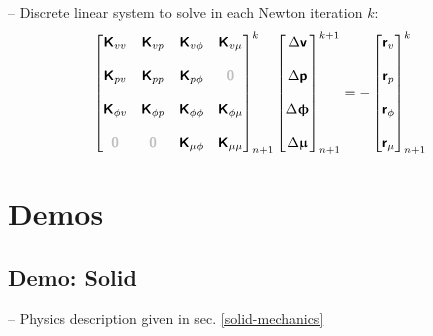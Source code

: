 \documentclass[a4paper,12pt]{report}
\newcommand{\bs}[1]{\boldsymbol{#1}}
\newcommand{\zerom}{\textcolor{lightgray}{\bs{\mathsf{0}}}}
\newcommand{\ROP}{\bs{\mathsf{r}}}
\begin{document}
-- Discrete linear system to solve in each Newton iteration $k$:
\begin{equation}
\label{equation-lin-sys-multiphase}
\begin{aligned}
\begin{bmatrix} \boldsymbol{\mathsf{K}}_{vv} & \boldsymbol{\mathsf{K}}_{vp} & \boldsymbol{\mathsf{K}}_{v\phi} & \boldsymbol{\mathsf{K}}_{v\mu} \\ \\ \boldsymbol{\mathsf{K}}_{pv} & \boldsymbol{\mathsf{K}}_{pp} & \boldsymbol{\mathsf{K}}_{p\phi} & \zerom \\ \\ \boldsymbol{\mathsf{K}}_{\phi v} & \boldsymbol{\mathsf{K}}_{\phi p} & \boldsymbol{\mathsf{K}}_{\phi \phi} & \boldsymbol{\mathsf{K}}_{\phi \mu} \\ \\ \zerom & \zerom & \boldsymbol{\mathsf{K}}_{\mu\phi} & \boldsymbol{\mathsf{K}}_{\mu\mu} \end{bmatrix}_{n+1}^{k}\begin{bmatrix} \Delta\boldsymbol{\mathsf{v}} \\ \\ \Delta\boldsymbol{\mathsf{p}} \\ \\ \Delta\boldsymbol{\upphi} \\ \\ \Delta\boldsymbol{\upmu}\end{bmatrix}_{n+1}^{k+1}=-\begin{bmatrix} \ROP_{v} \\ \\ \ROP_{p} \\ \\ \ROP_{\phi} \\ \\ \ROP_{\mu}\end{bmatrix}_{n+1}^{k}
\end{aligned}
\end{equation}


\section{Demos}\label{demos}

\subsection{Demo: Solid}\label{demo-solid}

-- Physics description given in sec. \ref{solid-mechanics}\\
\end{document}

